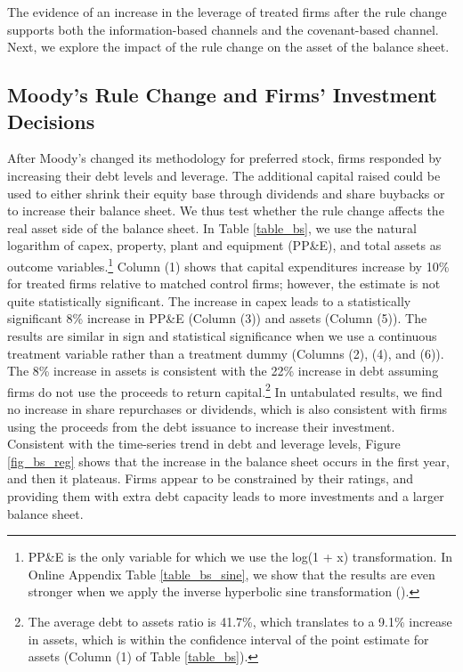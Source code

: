 \documentclass[a4paper, 12pt]{article}
\begin{document}
The evidence of an increase in the leverage of treated firms after the rule change supports both the information-based channels and the covenant-based channel. Next, we explore the impact of the rule change on the asset of the balance sheet.


\subsection{Moody's Rule Change and Firms' Investment Decisions}

After Moody's changed its methodology for preferred stock, firms responded by increasing their debt levels and leverage. The additional capital raised could be used to either shrink their equity base through dividends and share buybacks or to increase their balance sheet. We thus test whether the rule change affects the real asset side of the balance sheet. In Table \ref{table_bs}, we use the natural logarithm of capex, property, plant and equipment (PP\&E), and total assets as outcome variables.\footnote{PP\&E is the only variable for which we use the log(1 + x) transformation. In Online Appendix Table \ref{table_bs_sine}, we show that the results are even stronger when we apply the inverse hyperbolic sine transformation (\cite{cohn2022count}).} Column (1) shows that capital expenditures increase by 10\% for treated firms relative to matched control firms; however, the estimate is not quite statistically significant. The increase in capex leads to a statistically significant 8\% increase in PP\&E (Column (3)) and assets (Column (5)). The results are similar in sign and statistical significance when we use a continuous treatment variable rather than a treatment dummy (Columns (2), (4), and (6)). The 8\% increase in assets is consistent with the 22\% increase in debt assuming firms do not use the proceeds to return capital.\footnote{The average debt to assets ratio is 41.7\%, which translates to a 9.1\% increase in assets, which is within the confidence interval of the point estimate for assets (Column (1) of Table \ref{table_bs}).} In untabulated results, we find no increase in share repurchases or dividends, which is also consistent with firms using the proceeds from the debt issuance to increase their investment. Consistent with the time-series trend in debt and leverage levels, Figure \ref{fig_bs_reg} shows that the increase in the balance sheet occurs in the first year, and then it plateaus. Firms appear to be constrained by their ratings, and providing them with extra debt capacity leads to more investments and a larger balance sheet.
\end{document}
